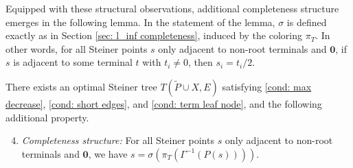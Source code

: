 \documentclass{article}\providecommand{\DeclareRedundantLanguages}[2]{}\usepackage[a4paper,margin=20mm]{geometry}
\newcommand{\1}{\textbf{1}}
\renewcommand{\tilde}{\widetilde}
\begin{document}
Equipped with these structural observations, additional completeness structure emerges in the following lemma. In the statement of the lemma, $\sigma$ is defined exactly as in Section \ref{sec: l_inf completeness}, induced by the coloring $\pi_T$. In other words, for all Steiner points $s$ only adjacent to non-root terminals and $\mathbf{0}$, if $s$ is adjacent to some terminal $t$ with $t_i \neq 0$, then $s_i = t_i /2$.

\begin{lemma} \label{lem: coordinates of 1/2}
There exists an optimal Steiner tree  $T(\tilde{P} \cup X, E)$ satisfying \ref{cond: max decrease}, \ref{cond: short edges}, and \ref{cond: term leaf node}, and the following additional property.
\begin{enumerate}[label=(P\arabic*)]
\setcounter{enumi}{3}
    \item \textit{Completeness structure:}  For all Steiner points $s$ only adjacent to non-root terminals and $\mathbf{0}$, we have $s = \sigma(\pi_T(\Gamma^{-1}(P(s))))$. \label{cond: completeness structure}
\end{enumerate}
\end{lemma}
\end{document}
